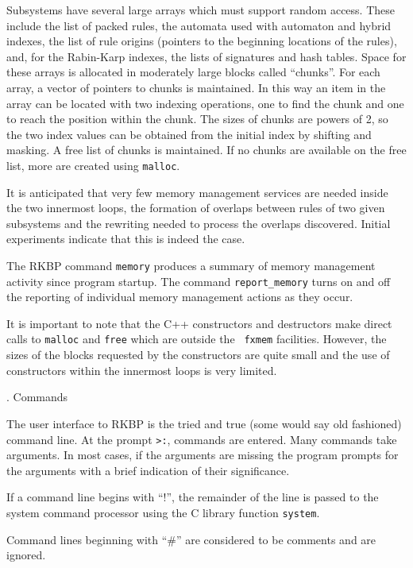 Subsystems have several large arrays which must support random access.
These include the list of packed rules, the automata used with
automaton and hybrid indexes, the list of rule origins (pointers to
the beginning locations of the rules), and, for the Rabin-Karp
indexes, the lists of signatures and hash tables.  Space for these
arrays is allocated in moderately large blocks called ``chunks''.  For
each array, a vector of pointers to chunks is maintained.  In this way
an item in the array can be located with two indexing operations, one
to find the chunk and one to reach the position within the chunk.  The
sizes of chunks are powers of 2, so the two index values can be
obtained from the initial index by shifting and masking.  A free list
of chunks is maintained.  If no chunks are available on the free list,
more are created using {\tt malloc}.

It is anticipated that very few memory management services are needed
inside the two innermost loops, the formation of overlaps between
rules of two given subsystems and the rewriting needed to process the
overlaps discovered.  Initial experiments indicate that this is indeed
the case.

The RKBP command {\tt memory} produces a summary of memory management
activity since program startup.  The command {\tt report\_memory}
turns on and off the reporting of individual memory management actions
as they occur.

It is important to note that the C++ constructors and destructors make
direct calls to {\tt malloc} and {\tt free} which are outside the {\tt
fxmem} facilities.  However, the sizes of the blocks requested by the
constructors are quite small and the use of constructors within the
innermost loops is very limited.

\bigskip
{}.  Commands

\nobreak

The user interface to RKBP is the tried and true (some would say old
fashioned) command line.  At the prompt {\tt >:}, commands are
entered.  Many commands take arguments.  In most cases, if the
arguments are missing the program prompts for the arguments with a
brief indication of their significance.

If a command line begins with ``!'', the remainder of the line is
passed to the system command processor using the C library function
{\tt system}.

Command lines beginning with ``\#'' are considered to be comments and
are ignored.

